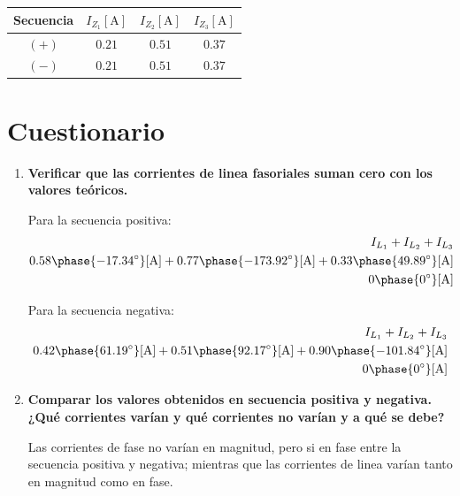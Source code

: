 \documentclass[letter,11pt]{article}
\begin{document}
\begin{center}
    \begin{tabular}{|c||c|c|c|}
    \hline
    \textbf{Secuencia} &
    $I_{Z_1}[\text{A}]$ & $I_{Z_2}[\text{A}]$ & $I_{Z_3}[\text{A}]$
    \tabularnewline \hline \hline
    $(+)$ & $0.21$ & $0.51$ & $0.37$
    \tabularnewline \hline
    $(-)$ & $0.21$ & $0.51$ & $0.37$
    \tabularnewline \hline
    \end{tabular}
\end{center}

\section{Cuestionario}

\begin{enumerate}

\item \textbf{Verificar que las corrientes de linea fasoriales suman cero con
los valores teóricos.}

Para la secuencia positiva:
\begin{equation*}
    \begin{split}
        I_{L_1}+I_{L_2}+I_{L_3}\\
        0.58\phase{-17.34^{\circ}}[\text{A}]+
        0.77\phase{-173.92^{\circ}}[\text{A}]+
        0.33\phase{49.89^{\circ}}[\text{A}]\\
        0\phase{0^{\circ}}[\text{A}]\\
    \end{split}
\end{equation*}

Para la secuencia negativa:
\begin{equation*}
    \begin{split}
        I_{L_1}+I_{L_2}+I_{L_3}\\
        0.42\phase{61.19^{\circ}}[\text{A}]+
        0.51\phase{92.17^{\circ}}[\text{A}]+
        0.90\phase{-101.84^{\circ}}[\text{A}]\\
        0\phase{0^{\circ}}[\text{A}]\\
    \end{split}
\end{equation*}

\item \textbf{Comparar los valores obtenidos en secuencia positiva y negativa.
¿Qué corrientes varían y qué corrientes no varían y a qué se debe?}

Las corrientes de fase no varían en magnitud, pero si en fase entre la secuencia
positiva y negativa; mientras que las corrientes de linea varían tanto en
magnitud como en fase.


\end{enumerate}
\end{document}
